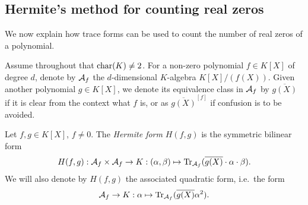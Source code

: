\documentclass[12pt, leqno, british]{amsart}
\begin{document}
%

\subsection{Hermite's method for counting real zeros}
We now explain how trace forms can be used to count the number of real zeros of a polynomial.

Assume throughout that $\operatorname{char}(K) \neq 2$.
For a non-zero polynomial $f \in K[X]$ of degree $d$, denote by $\mathcal{A}_f$ the $d$-dimensional $K$-algebra $K[X]/(f(X))$.
Given another polynomial $g \in K[X]$, we denote its equivalence class in $\mathcal{A}_f$ by $\overline{g(X)}$ if it is clear from the context what $f$ is, or as $\overline{g(X)}^{[f]}$ if confusion is to be avoided.
\begin{defi}
Let $f, g \in K[X]$, $f \neq 0$.
The \emph{Hermite form} $H(f, g)$ is the symmetric bilinear form
$$ H(f, g) : \mathcal{A}_f \times \mathcal{A}_f \to K : (\alpha, \beta) \mapsto \operatorname{Tr}_{\mathcal{A}_f}(\overline{g(X)} \cdot \alpha \cdot \beta).$$
We will also denote by $H(f, g)$ the associated quadratic form, i.e.~the form
$$ \mathcal{A}_f \to K : \alpha \mapsto \operatorname{Tr}_{\mathcal{A}_f}(\overline{g(X)} \alpha^2).$$
\end{defi}
\end{document}
